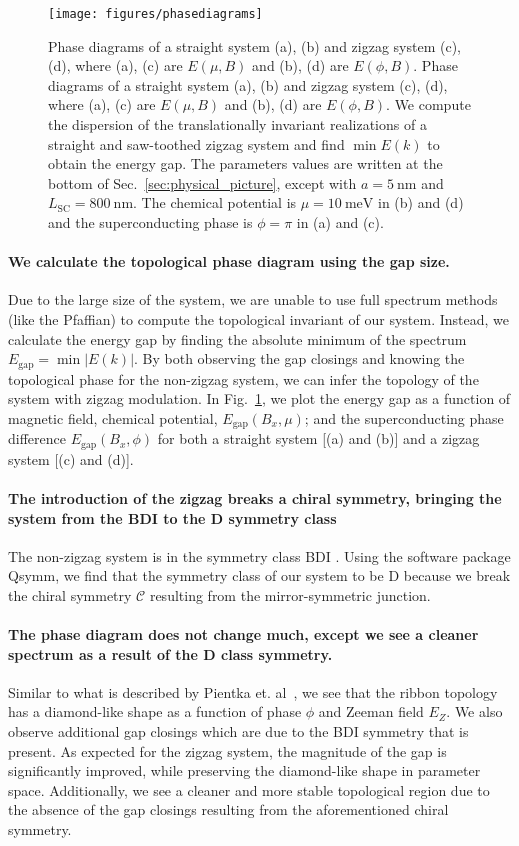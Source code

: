 \documentclass[english, twocolumn, 10pt, aps, superscriptaddress, floatfix, prb, citeautoscript]{revtex4-1}
\renewcommand{\comment}[2]{#2}
\renewcommand{\comment}{\paragraph}
\begin{document}
\begin{figure}[!htb]
\texttt{[image: figures/phasediagrams]}
\caption{Phase diagrams of a straight system (a), (b) and zigzag system (c), (d), where (a), (c) are $E(\mu, B)$ and (b), (d) are $E(\phi, B)$.
Phase diagrams of a straight system (a), (b) and zigzag system (c), (d), where (a), (c) are $E(\mu, B)$ and (b), (d) are $E(\phi, B)$.
We compute the dispersion of the translationally invariant realizations of a straight and saw-toothed zigzag system and find $\min{E(k)}$ to obtain the energy gap.
The parameters values are written at the bottom of Sec.~\ref{sec:physical_picture}, except with $a=\SI{5}{\nm}$ and $L_\textrm{SC}=\SI{800}{\nm}$.
The chemical potential is $\mu=\SI{10}{\meV}$ in (b) and (d) and the superconducting phase is $\phi=\pi$ in (a) and (c).
\label{fig:phasediagrams}}
\end{figure}

\comment{We calculate the topological phase diagram using the gap size.}
Due to the large size of the system, we are unable to use full spectrum methods (like the Pfaffian) to compute the topological invariant of our system.
Instead, we calculate the energy gap by finding the absolute minimum of the spectrum $E_\textrm{gap}=\min{|E(k)|}$.
By both observing the gap closings and knowing the topological phase for the non-zigzag system, we can infer the topology of the system with zigzag modulation.
In Fig.~\ref{fig:phasediagrams}, we plot the energy gap as a function of magnetic field, chemical potential, $E_\textrm{gap}(B_x, \mu)$; and the superconducting phase difference $E_\textrm{gap}(B_x, \phi)$ for both a straight system [(a) and (b)] and a zigzag system [(c) and (d)].

\comment{The introduction of the zigzag breaks a chiral symmetry, bringing the system from the BDI to the D symmetry class}
The non-zigzag system is in the symmetry class BDI \cite{pientka2017topological}.
Using the software package Qsymm\cite{varjas2018qsymm}, we find that the symmetry class of our system to be D because we break the chiral symmetry $\mathcal{C}$ resulting from the mirror-symmetric junction.

\comment{The phase diagram does not change much, except we see a cleaner spectrum as a result of the D class symmetry.}
Similar to what is described by Pientka et. al~\cite{pientka2017topological}, we see that the ribbon topology has a diamond-like shape as a function of phase $\phi$ and Zeeman field $E_Z$.
We also observe additional gap closings which are due to the BDI symmetry that is present.
As expected for the zigzag system, the magnitude of the gap is significantly improved, while preserving the diamond-like shape in parameter space.
Additionally, we see a cleaner and more stable topological region due to the absence of the gap closings resulting from the aforementioned chiral symmetry.
\end{document}
